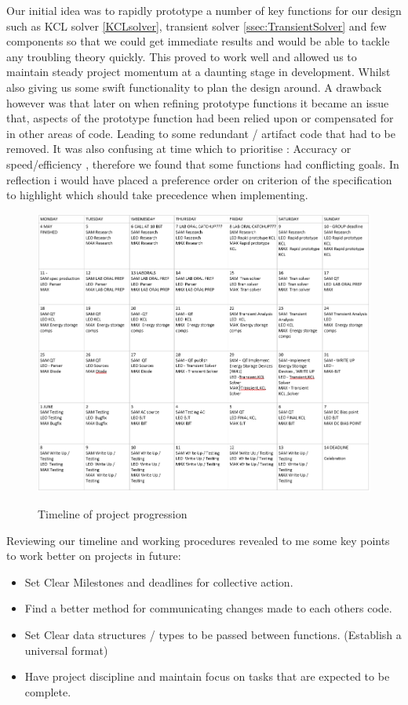 \documentclass{article}
\begin{document}
Our initial idea was to rapidly prototype a number of key functions for our design such as KCL solver \ref{KCLsolver}, transient solver \ref{ssec:TransientSolver} and few components so that we could get immediate results and would be able to tackle any troubling theory quickly. This proved to work well and allowed us to maintain steady project momentum at a daunting stage in development. Whilst also giving us some swift functionality to  plan the design around.  A drawback however was that later on when refining prototype functions it became an issue that, aspects of the prototype function had been relied upon or compensated for in other areas of code. Leading to some redundant / artifact code that had to be removed.
\medbreak
It was also confusing at time which to prioritise : Accuracy or speed/efficiency , therefore we found that some functions had conflicting goals. In reflection i would have placed a preference order on criterion of the specification to highlight which should take precedence when implementing.  
\smallbreak
\begin{figure}[h]
    \caption{Timeline of project progression}
    \centering
    \includegraphics[width=0.6\linewidth]{images/Timeline.PNG}
    \label{fig:Timeline}
\end{figure}
Reviewing our timeline and working procedures revealed to me some key points to work better on projects in future:
\begin{itemize}
    \item Set Clear Milestones and deadlines for collective action.
    \item Find a better method for communicating changes made to each others code.
    \item Set Clear data structures / types to be passed between functions. (Establish a universal format)
    \item Have project discipline and maintain focus on tasks that are expected to be complete.
\end{itemize}
\newpage
\end{document}
